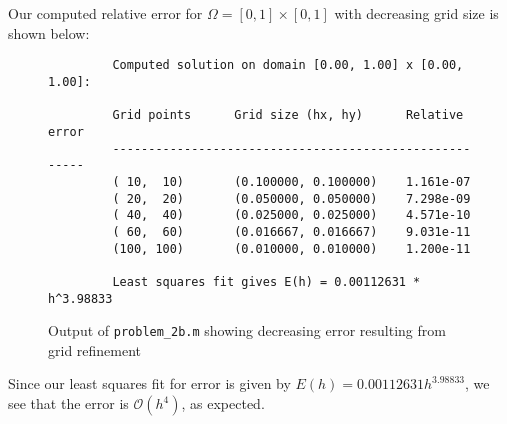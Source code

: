 \begin{solution}\ \\\\
    Our computed relative error for $\Omega = [0, 1] \times [0, 1]$ with decreasing grid size is shown below:

    \begin{figure}[h]
        \begin{lstlisting}
         Computed solution on domain [0.00, 1.00] x [0.00, 1.00]:

         Grid points      Grid size (hx, hy)      Relative error
         -------------------------------------------------------
         ( 10,  10)       (0.100000, 0.100000)    1.161e-07
         ( 20,  20)       (0.050000, 0.050000)    7.298e-09
         ( 40,  40)       (0.025000, 0.025000)    4.571e-10
         ( 60,  60)       (0.016667, 0.016667)    9.031e-11
         (100, 100)       (0.010000, 0.010000)    1.200e-11
         
         Least squares fit gives E(h) = 0.00112631 * h^3.98833
        \end{lstlisting}
        \caption{Output of \texttt{problem\_2b.m} showing decreasing error resulting from grid refinement}
    \end{figure}
    
    Since our least squares fit for error is given by $E(h) = 0.00112631 h^{3.98833}$, we see that the error is 
    $\mathcal{O}(h^4)$, as expected.
    \ \\
\end{solution}